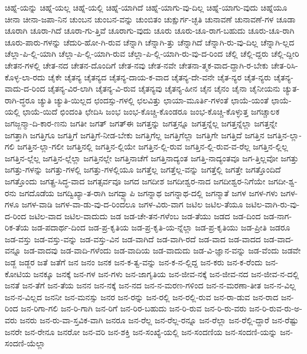 {ಚಿಹ್ನೆ-ಯನ್ನು
ಚಿಹ್ನೆ-ಯಲ್ಲ
ಚಿಹ್ನೆ-ಯಲ್ಲಿ
ಚಿಹ್ನೆ-ಯಾಗಿದೆ
ಚಿಹ್ನೆ-ಯಾಗು-ವು-ದಿಲ್ಲ
ಚಿಹ್ನೆ-ಯಾಗು-ವುದು
ಚಿಹ್ನೆಯೂ
ಚೀನಾ
ಚೀನಾ-ಜಪಾ-ನಿನ
ಚುಂಬನ
ಚುಂಬನ-ವನ್ನು
ಚುಂಬಿತಂ
ಚುಕ್ಷುರ್ಗ-ಚ್ಛತಿ
ಚುನಾವಣೆ
ಚುನಾವಣೆ-ಗಳ
ಚೂಡಾ
ಚೂರಾಗಿ
ಚೂರಾ-ಗಿದೆ
ಚೂರಾ-ಗು-ತ್ತಿವೆ
ಚೂರಾಗು-ವುದು
ಚೂರು
ಚೂರು-ಚೂ-ರಾಗ-ಬಹುದು
ಚೂರು-ಚೂ-ರಾಗಿ
ಚೂರು-ಪಾರು-ಗಳನ್ನು
ಚೆದುರಿ-ಹೋ-ಗಿ-ರುವ
ಚೆನ್ನಾಗಿ
ಚೆನ್ನಾಗಿ-ತ್ತು
ಚೆನ್ನಾಗಿದೆ
ಚೆನ್ನಾಗಿ-ರು-ವು-ದಿಲ್ಲ
ಚೆನ್ನಾಗಿ-ಲ್ಲದ
ಚೆಲ್ಲಾ-ಪಿ-ಲ್ಲಿ-ಯಾಗಿ
ಚೆಲ್ಲಾ-ಪಿ-ಲ್ಲಿ-ಯಾಗಿ-ರುವ
ಚೆಲ್ಲಾ-ಪಿ-ಲ್ಲಿ-ಯಾಗಿ-ರು-ವು-ದ-ರಿಂದ
ಚೆಲ್ಲಿ
ಚೆಲ್ಲಿ-ದ್ದರು
ಚೆಲ್ಲಿ-ದ್ದೀರಿ
ಚೇತನ-ಗಳಲ್ಲಿ
ಚೇತ-ನದ
ಚೇತನ-ದೊಂದಿಗೆ
ಚೇತ-ನವು
ಚೇತ-ನವೇ
ಚೇತನಾ-ತ್ಮಕ-ವಾದ-ದ್ದಾಗಿ-ರ-ಬೇಕು
ಚೇತ-ರಿಸಿ-ಕೊಳ್ಳ-ಲಾ-ರದು
ಚೈಕೇ
ಚೈತನ್ಯ
ಚೈತನ್ಯದ
ಚೈತನ್ಯ-ದಾಯ-ಕ-ವಾದ
ಚೈತನ್ಯ-ದೇ-ವನೇ
ಚೈತ-ನ್ಯರ
ಚೈತ-ನ್ಯರು
ಚೈತನ್ಯ-ವಾದು-ದ-ರಿಂದ
ಚೈತನ್ಯ-ವಿರ-ಲಾಗಿ
ಚೈತನ್ಯ-ವಿ-ರುವ
ಚೈತನ್ಯವು
ಚೈತನ್ಯ-ಹೀನ
ಚೈನ
ಚೈನಂ
ಚೈನಾ
ಚೈನೀಯನು
ಚ್ಯುತ-ರಾಗಿ-ದ್ಧರೂ
ಚ್ಯುತಿ
ಚ್ಯುತಿ-ಯಿಲ್ಲದ
ಛಂದಸ್ಸು-ಗಳಲ್ಲಿ
ಛಲವಿತ್ತು
ಛಾಯಾ-ಮೂರ್ತಿ-ಗಳಂತೆ
ಛಾಯೆ-ಯಂತೆ
ಛಾಯೆ-ಯಲ್ಲಿ
ಛಾಯೆ-ಯಿದೆ
ಛಿಂದಂತಿ
ಛೇದಿಸಿ
ಜಂಭ
ಜಂಭ-ಕೊಚ್ಚಿ-ಕೊಂಡರೂ
ಜಂಭ-ಕೊಚ್ಚಿ-ಕೊಳ್ಳುತ್ತ
ಜಗಚ್ಚಾಲಕ
ಜಗಜ್ಜನ್ಮಾ-ದಿ-ಕಾರ-ಣನು
ಜಗತೀ
ಜಗತ್
ಜಗತ್ಈ
ಜಗತ್ತನ್ನು
ಜಗತ್ತನ್ನೂ
ಜಗತ್ತನ್ನೆಲ್ಲ
ಜಗತ್ತನ್ನೆಲ್ಲಾ
ಜಗತ್ತನ್ನೇ
ಜಗತ್ತಾಗಿ
ಜಗತ್ತಿಗೂ
ಜಗತ್ತಿಗೆ
ಜಗತ್ತಿಗೆ-ನೀಡ-ಬೇಕು
ಜಗತ್ತಿಗೆಲ್ಲ
ಜಗತ್ತಿಗೆಲ್ಲಾ
ಜಗತ್ತಿಗೇ
ಜಗತ್ತಿದೆ
ಜಗತ್ತಿನ
ಜಗತ್ತಿನ-ಲ್ಲಾ-ಗಲಿ
ಜಗತ್ತಿನ-ಲ್ಲಾ-ಗಲೀ
ಜಗತ್ತಿನಲ್ಲಿ
ಜಗತ್ತಿನ-ಲ್ಲಿಯೇ
ಜಗತ್ತಿನ-ಲ್ಲಿ-ರುವ
ಜಗತ್ತಿನ-ಲ್ಲಿ-ರುವ-ವ-ರೆಲ್ಲ
ಜಗತ್ತಿನ-ಲ್ಲಿಲ್ಲ
ಜಗತ್ತಿನ-ಲ್ಲೆಲ್ಲ
ಜಗತ್ತಿನ-ಲ್ಲೆಲ್ಲಾ
ಜಗತ್ತಿನಲ್ಲೇ
ಜಗತ್ತಿನಾಚೆಗೆ
ಜಗತ್ತಿನಾದ್ಯಂತ
ಜಗತ್ತಿ-ನಾದ್ಯಂತವೂ
ಜಗ-ತ್ತಿಲ್ಲವೋ
ಜಗತ್ತು
ಜಗತ್ತು-ಗಳನ್ನು
ಜಗತ್ತು-ಗಳಲ್ಲಿ
ಜಗತ್ತು-ಗಳಲ್ಲಿಯೂ
ಜಗತ್ತೆಲ್ಲ
ಜಗತ್ತೆಲ್ಲ-ವನ್ನು
ಜಗತ್ತೆಲ್ಲಿ
ಜಗತ್ತೇ
ಜಗತ್ತೊಂದಿದೆ
ಜಗತ್ತೊಂದು
ಜಗತ್ಪ್ರ-ಸಿದ್ಧ-ವಾದ
ಜಗತ್ಸರ್ವವೂ
ಜಗದ
ಜಗದೀಶ
ಜಗದೀಶ್ವರ-ನಾದ
ಜಗದೀಶ್ವರ-ನಿಗೆಯೇ
ಜಗದೀ-ಶ್ವ-ರನು
ಜಗದೊಡೆಯ
ಜಗದ್ವಿಖ್ಯಾ-ತ-ರಾಗಿ
ಜಗದ್ವ್ಯಾಪಿ
ಜಗನ್ನಾಥ
ಜಗನ್ನಾಥ-ದಲ್ಲಿ
ಜಗನ್ಮಾತೆ
ಜಗಳ
ಜಗಳ-ಗಳು
ಜಗಳ-ಗಳೂ
ಜಗಳ-ವಾಡಿ
ಜಗಳ-ವಾ-ಡು-ವು-ದ-ರಿಂದಲೂ
ಜಗಳ-ವಿರು-ವಾಗ
ಜಟಿಲ
ಜಟಿಲ-ತೆಯೂ
ಜಟಿಲ-ವಾಗಿ-ರು-ವು-ದ-ರಿಂದ
ಜಟಿಲ-ವಾದ
ಜಟಿಲ-ವಾದುದು
ಜಡ
ಜಡ-ಚೇ-ತನ-ಗಳೆಂಬ
ಜಡ-ತೆಯು
ಜಡದ
ಜಡ-ದಿಂದ
ಜಡ-ನಾಗ-ರಿಕ-ತೆಯ
ಜಡ-ಪದಾರ್ಥ-ದಿಂದ
ಜಡ-ಪ್ರ-ಕೃತಿಯ
ಜಡ-ಪ್ರ-ಕೃತಿ-ಯ-ನ್ನೆಲ್ಲಾ
ಜಡ-ಪ್ರ-ಕೃತಿಯು
ಜಡ-ಪ್ರೀತಿ
ಜಡರೂ
ಜಡ-ವಸ್ತು
ಜಡ-ವಸ್ತು-ವನ್ನು
ಜಡ-ವಸ್ತು-ವಿನ
ಜಡ-ವಾಗಿದೆ
ಜಡ-ವಾಗಿ-ರದೆ
ಜಡ-ವಾದ
ಜಡ-ವಾದದ
ಜಡ-ವಾದ-ವನ್ನೂ
ಜಡ-ವಾದವು
ಜಡ-ವಾದಿ-ಗಳೆಂದು
ಜಡ-ವಾದಿಯ
ಜಡ-ವಾದುದು
ಜಡ-ವಿ-ಜ್ಞಾನ-ವನ್ನು
ಜಡ-ವೆಂದು
ಜಡವೇ
ಜಡ್ಜ
ಜಡ್ಜರ
ಜತೆ
ಜತೆಗೆ
ಜನ
ಜನಂ
ಜನಕ
ಜನ-ಕ-ತ್ವ-ವನ್ನು
ಜನ-ಕ-ನ-ಲ್ಲಿದ್ದ
ಜನ-ಕರು
ಜನ-ಕ-ರೆಂದು
ಜನ-ಕೋಟಿಯ
ಜನಕ್ಕೂ
ಜನಕ್ಕೆ
ಜನ-ಗಳ
ಜನ-ಗಳು
ಜನ-ಜಾಗೃತಿಯ
ಜನ-ಜೀವ-ನಕ್ಕೆ
ಜನ-ಜೀವ-ನದ
ಜನ-ಜೀವ-ನ-ದಲ್ಲಿ
ಜನತೆ
ಜನ-ತೆಗೆ
ಜನ-ತೆಯ
ಜನನ
ಜನ-ನಕ್ಕೆ
ಜನ-ನದ
ಜನ-ನ-ಮರಣ-ಗಳಿಂದ
ಜನ-ನ-ಮರಣಾ-ತೀತ
ಜನ-ನ-ವಿಲ್ಲ
ಜನ-ನ-ವಿಲ್ಲದ
ಜನನೀ
ಜನ-ಮನಸ್ಸು
ಜನರ
ಜನ-ರನ್ನು
ಜನ-ರಲ್ಲಿ
ಜನ-ರಲ್ಲಿ-ರುವ
ಜನ-ರಾ-ಡುವ
ಜನ-ರಾದ
ಜನ-ರಿಂದ
ಜನ-ರಿಗಾ-ಗಲಿ
ಜನ-ರಿ-ಗಾಗಿ
ಜನ-ರಿಗೆ
ಜನ-ರಿರ-ಬಹುದು
ಜನ-ರಿ-ರುವ
ಜನ-ರಿ-ರು-ವರು
ಜನ-ರಿ-ರುವ-ರು-ಅ-ವರು
ಜನರು
ಜನ-ರು-ವಾ-ಸ್ತವಿಕ-ವಾಗಿ
ಜನರೂ
ಜನ-ರೆಲ್ಲ
ಜನ-ರೆಲ್ಲ-ರನ್ನೂ
ಜನ-ರೆಲ್ಲಾ
ಜನ-ರೆಲ್ಲಿ-ದ್ದಾರೆ
ಜನ-ರೆಷ್ಟು
ಜನರೇ
ಜನ-ರೇನೂ
ಜನರೋ
ಜನ-ವರಿ
ಜನ-ಶಕ್ತಿ
ಜನ-ಸಂಖ್ಯೆ-ಯಲ್ಲಿ
ಜನ-ಸಂದಣಿಯ
ಜನ-ಸಂದಣಿ-ಯನ್ನು
ಜನ-ಸಂದಣಿ-ಯೆಲ್ಲಾ
}
